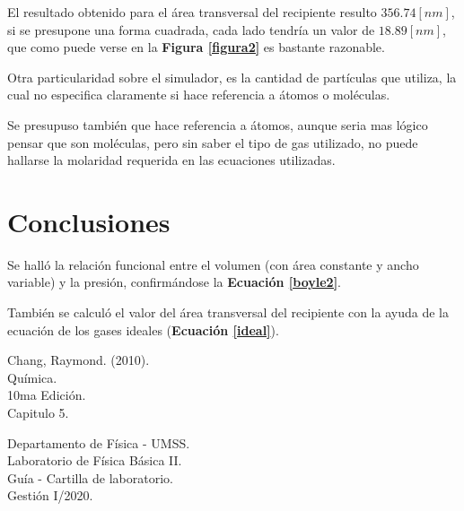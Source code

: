 \documentclass[letter,11pt]{article}
\begin{document}
El resultado obtenido para el área transversal del recipiente resulto
$356.74 [nm]$, si se presupone una forma cuadrada, cada lado tendría un valor
de $18.89 [nm]$, que como puede verse en la \textbf{Figura \ref{figura2}} es
bastante razonable.

Otra particularidad sobre el simulador, es la cantidad de partículas que
utiliza, la cual no especifica claramente si hace referencia a átomos o
moléculas.

Se presupuso también que hace referencia a átomos, aunque seria mas lógico
pensar que son moléculas, pero sin saber el tipo de gas utilizado, no puede
hallarse la molaridad requerida en las ecuaciones utilizadas.

\section{Conclusiones}

Se halló la relación funcional entre el volumen (con área constante y ancho
variable) y la presión, confirmándose la \textbf{Ecuación \ref{boyle2}}.

También se calculó el valor del área transversal del recipiente con la ayuda
de la ecuación de los gases ideales (\textbf{Ecuación \ref{ideal}}).

\begin{thebibliography}{99}

 Chang, Raymond. (2010).\\
Química.\\
10ma Edición.\\
Capitulo 5.

 Departamento de Física - UMSS.\\
Laboratorio de Física Básica II.\\
Guía - Cartilla de laboratorio.\\
Gestión I/2020.

\end{thebibliography}
\end{document}
